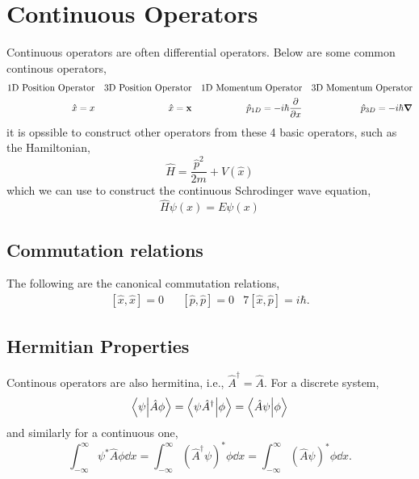\documentclass{book}
\begin{document}
\section{Continuous Operators}
Continuous operators are often differential operators. Below are some common continous operators,
\begin{align*}
	\text{1D Position Operator} && \text{3D Position Operator} && \text{1D Momentum Operator} && \text{3D Momentum Operator} \\
	\hat{x} = x && \hat{x} = \vb{x} && \hat{p}_{1D} = -i\hbar \pdv{x} && \hat{p}_{3D} = -i\hbar \grad
\end{align*}
it is opssible to construct other operators from these 4 basic operators, such as the Hamiltonian,
\begin{equation}
	\hat{H} = \frac{\hat{p}^2}{2m} + V(\hat{x}) \label{eq:hamiltonian}
\end{equation}
which we can use to construct the continuous Schrodinger wave equation,
\begin{equation}
	\hat{H} \psi(x) = E\psi(x)
\end{equation}
\subsection{Commutation relations}
The following are the canonical commutation relations,
\begin{align}
	\left[\hat{x},\hat{x}\right] = 0 && \left[\hat{p},\hat{p}\right] = 0 &7 \left[\hat{x},\hat{p}\right] = i\hbar.
\end{align}
\subsection{Hermitian Properties}
Continous operators are also hermitina, i.e., $\hat{A}^{\dag} = \hat{A}$. For a discrete system,
\begin{equation}
	\braket{\psi}{\hat{A}\phi} = \braket{\psi\hat{A}^{\dag}}{\phi} = \braket{\hat{A}\psi}{\phi}
\end{equation}
and similarly for a continuous one,
\begin{equation}
	\int_{-\infty}^{\infty}\psi^*\hat{A}\phi \dd{x} = \int_{-\infty}^{\infty}(\hat{A}^{\dag}\psi)^*\phi \dd{x} = \int_{-\infty}^{\infty}(\hat{A}\psi)^*\phi \dd{x}.
\end{equation}
\end{document}
